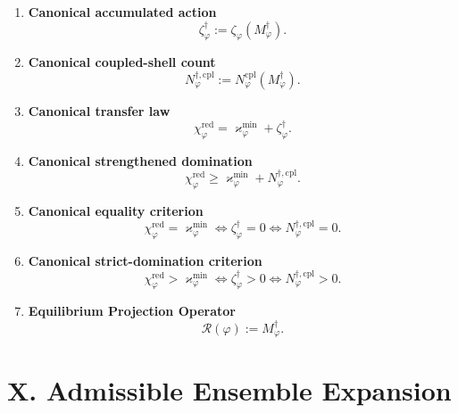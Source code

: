 \documentclass[11pt,letterpaper]{article}
\theoremstyle{plain}
\theoremstyle{definition}
\theoremstyle{remark}
\newcommand{\RestInertia}{\varkappa}
\newcommand{\TotInertia}{\chi}
\newcommand{\AccAction}{\zeta}
\newcommand{\ResEns}{\varphi}
\newcommand{\GroundProj}{\mathscr{R}}
\begin{document}
\begin{enumerate}[resume]
\item \textbf{Canonical accumulated action}
\[
\AccAction_{\ResEns}^{\dagger}
:=
\AccAction_{\ResEns}(M_{\ResEns}^{\dagger}).
\]

\item \textbf{Canonical coupled-shell count}
\[
N_{\ResEns}^{\dagger, \mathrm{cpl}}
:=
N_{\ResEns}^{\mathrm{cpl}}(M_{\ResEns}^{\dagger}).
\]

\item \textbf{Canonical transfer law}
\[
\TotInertia_{\ResEns}^{\mathrm{red}}
=
\RestInertia_{\ResEns}^{\min}
+
\AccAction_{\ResEns}^{\dagger}.
\]

\item \textbf{Canonical strengthened domination}
\[
\TotInertia_{\ResEns}^{\mathrm{red}}
\ge
\RestInertia_{\ResEns}^{\min}
+
N_{\ResEns}^{\dagger, \mathrm{cpl}}.
\]

\item \textbf{Canonical equality criterion}
\[
\TotInertia_{\ResEns}^{\mathrm{red}}
=
\RestInertia_{\ResEns}^{\min}
\iff
\AccAction_{\ResEns}^{\dagger}=0
\iff
N_{\ResEns}^{\dagger, \mathrm{cpl}}=0.
\]

\item \textbf{Canonical strict-domination criterion}
\[
\TotInertia_{\ResEns}^{\mathrm{red}}
>
\RestInertia_{\ResEns}^{\min}
\iff
\AccAction_{\ResEns}^{\dagger}>0
\iff
N_{\ResEns}^{\dagger, \mathrm{cpl}}>0.
\]

\item \textbf{Equilibrium Projection Operator}
\[
\GroundProj(\ResEns):=M_{\ResEns}^{\dagger}.
\]
\end{enumerate}

\section*{X. Admissible Ensemble Expansion}
\end{document}
